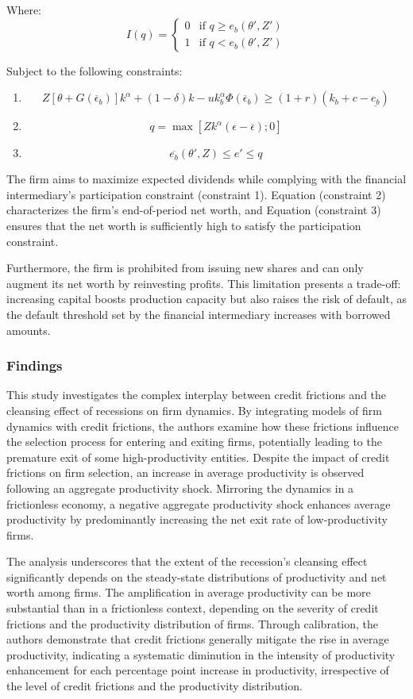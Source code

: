 \documentclass[12pt]{report}
\begin{document}
Where:
\[
I(q)=
\begin{cases}
    0 & \text{if } q\geq e_b(\theta', Z')\\
    1 & \text{if } q< e_b(\theta', Z')
\end{cases}
\]

Subject to the following constraints:
\begin{enumerate}
    \item \label{con1}\[
    Z[\theta+G(\overline{\epsilon}_b )]k^\alpha+(1-\delta)k-uk_b^\alpha\Phi (\overline{\epsilon}_b)\geq(1+r)(k_b+c-
    \underline{e_b})
    \]
    \item \label{con2} \[
    q = \max[Zk^\alpha(\epsilon-\overline{\epsilon});0]
    \]
    \item \label{con3}\[
    \overline{e_b}(\theta',Z)\leq e'\leq q
    \]
\end{enumerate}

The firm aims to maximize expected dividends while complying with the financial intermediary's participation constraint
(constraint 1). Equation (constraint 2) characterizes the firm's end-of-period net worth, and
Equation (constraint 3) ensures that the
net worth
is sufficiently high to satisfy the participation constraint.
\par
Furthermore, the firm is prohibited from issuing new shares and can only augment its net worth by reinvesting profits.
This limitation presents a trade-off: increasing capital boosts production capacity but also raises the risk of default,
as the default threshold set by the financial intermediary increases with borrowed amounts.
\subsubsection{Findings}
This study investigates the complex interplay between credit frictions and the cleansing effect of recessions on firm
dynamics. By integrating models of firm dynamics with credit frictions, the authors examine how these frictions
influence the selection process for entering and exiting firms, potentially leading to the premature exit of some
high-productivity entities. Despite the impact of credit frictions on firm selection, an increase in average
productivity is observed following an aggregate productivity shock. Mirroring the dynamics in a frictionless economy, a
negative aggregate productivity shock enhances average productivity by predominantly increasing the net exit rate of
low-productivity firms. 

The analysis underscores that the extent of the recession's cleansing effect significantly depends on the steady-state
distributions of productivity and net worth among firms. The amplification in average productivity can be more
substantial than in a frictionless context, depending on the severity of credit frictions and the productivity
distribution of firms. Through calibration, the authors demonstrate that credit frictions generally mitigate the rise in
average productivity, indicating a systematic diminution in the intensity of productivity enhancement for each
percentage point increase in productivity, irrespective of the level of credit frictions and the productivity
distribution. 
\end{document}
